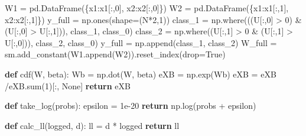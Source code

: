 \documentclass[]{tufte-book}
\newenvironment{Shaded}{}{}
\newcommand{\BuiltInTok}[1]{#1}
\newcommand{\ControlFlowTok}[1]{\textcolor[rgb]{0.00,0.44,0.13}{\textbf{#1}}}
\newcommand{\DecValTok}[1]{\textcolor[rgb]{0.25,0.63,0.44}{#1}}
\newcommand{\FloatTok}[1]{\textcolor[rgb]{0.25,0.63,0.44}{#1}}
\newcommand{\KeywordTok}[1]{\textcolor[rgb]{0.00,0.44,0.13}{\textbf{#1}}}
\newcommand{\NormalTok}[1]{#1}
\newcommand{\OperatorTok}[1]{\textcolor[rgb]{0.40,0.40,0.40}{#1}}
\newcommand{\StringTok}[1]{\textcolor[rgb]{0.25,0.44,0.63}{#1}}
\newcommand{\VariableTok}[1]{\textcolor[rgb]{0.10,0.09,0.49}{#1}}
\theoremstyle{definition}
\theoremstyle{definition}
\theoremstyle{definition}
\theoremstyle{remark}
\begin{document}
\begin{Shaded}
\begin{Highlighting}[]
\NormalTok{W1 }\OperatorTok{=}\NormalTok{ pd.DataFrame(\{}\StringTok{\textquotesingle{}x1\textquotesingle{}}\NormalTok{:x1[:,}\DecValTok{0}\NormalTok{], }\StringTok{\textquotesingle{}x2\textquotesingle{}}\NormalTok{:x2[:,}\DecValTok{0}\NormalTok{]\})}
\NormalTok{W2 }\OperatorTok{=}\NormalTok{ pd.DataFrame(\{}\StringTok{\textquotesingle{}x1\textquotesingle{}}\NormalTok{:x1[:,}\DecValTok{1}\NormalTok{], }\StringTok{\textquotesingle{}x2\textquotesingle{}}\NormalTok{:x2[:,}\DecValTok{1}\NormalTok{]\})}
\NormalTok{y\_full }\OperatorTok{=}\NormalTok{ np.ones(shape}\OperatorTok{=}\NormalTok{(N}\OperatorTok{*}\DecValTok{2}\NormalTok{,}\DecValTok{1}\NormalTok{))}
\NormalTok{class\_1 }\OperatorTok{=}\NormalTok{ np.where(((U[:,}\DecValTok{0}\NormalTok{] }\OperatorTok{\textgreater{}} \DecValTok{0}\NormalTok{) }\OperatorTok{\&}\NormalTok{ (U[:,}\DecValTok{0}\NormalTok{] }\OperatorTok{\textgreater{}}\NormalTok{ U[:,}\DecValTok{1}\NormalTok{])), }\StringTok{\textquotesingle{}class\_1\textquotesingle{}}\NormalTok{, }\StringTok{\textquotesingle{}class\_0\textquotesingle{}}\NormalTok{)}
\NormalTok{class\_2 }\OperatorTok{=}\NormalTok{ np.where((U[:,}\DecValTok{1}\NormalTok{] }\OperatorTok{\textgreater{}} \DecValTok{0} \OperatorTok{\&}\NormalTok{ (U[:,}\DecValTok{1}\NormalTok{] }\OperatorTok{\textgreater{}}\NormalTok{ U[:,}\DecValTok{0}\NormalTok{])), }\StringTok{\textquotesingle{}class\_2\textquotesingle{}}\NormalTok{, }\StringTok{\textquotesingle{}class\_0\textquotesingle{}}\NormalTok{)}
\NormalTok{y\_full }\OperatorTok{=}\NormalTok{ np.append(class\_1, class\_2)}
\NormalTok{W\_full }\OperatorTok{=}\NormalTok{ sm.add\_constant(W1.append(W2)).reset\_index(drop}\OperatorTok{=}\VariableTok{True}\NormalTok{)}


\KeywordTok{def}\NormalTok{ cdf(W, beta):}
\NormalTok{    Wb }\OperatorTok{=}\NormalTok{ np.dot(W, beta)}
\NormalTok{    eXB }\OperatorTok{=}\NormalTok{ np.exp(Wb)}
\NormalTok{    eXB }\OperatorTok{=}\NormalTok{ eXB }\OperatorTok{/}\NormalTok{eXB.}\BuiltInTok{sum}\NormalTok{(}\DecValTok{1}\NormalTok{)[:, }\VariableTok{None}\NormalTok{]}
    \ControlFlowTok{return}\NormalTok{ eXB}

\KeywordTok{def}\NormalTok{ take\_log(probs):}
\NormalTok{    epsilon }\OperatorTok{=} \FloatTok{1e{-}20} 
    \ControlFlowTok{return}\NormalTok{ np.log(probs }\OperatorTok{+}\NormalTok{ epsilon)}

\KeywordTok{def}\NormalTok{ calc\_ll(logged, d):}
\NormalTok{    ll }\OperatorTok{=}\NormalTok{ d }\OperatorTok{*}\NormalTok{ logged}
    \ControlFlowTok{return}\NormalTok{ ll}


\end{Highlighting}
\end{Shaded}
\end{document}
